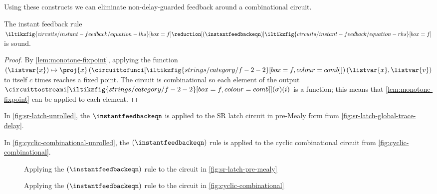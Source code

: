 \documentclass{lmcs}
\begin{document}
Using these constructs we can eliminate non-delay-guarded feedback around a
combinational circuit.

\begin{prop}\label{prop:instant-feedback}
    The instant feedback rule \(
    \iltikzfig{circuits/instant-feedback/equation-lhs}[box=f]
    \reduction[(\instantfeedbackeqn)]
    \iltikzfig{circuits/instant-feedback/equation-rhs}[box=f]
    \) is sound.
\end{prop}
\begin{proof}
    By \autoref{lem:monotone-fixpoint}, applying the function \(
    (\listvar{x}) \mapsto \proj{x}\left(\circuittofunci[
        \iltikzfig{strings/category/f-2-2}[box=f,colour=comb]
    ]\right)(\listvar{x}, \listvar{v})\) to itself \(c\) times reaches a
    fixed point.
    The circuit is combinational so each element of the output
    \(\circuittostreami[
        \iltikzfig{strings/category/f-2-2}[box=f,colour=comb]
    ](\sigma)(i)\) is a function; this means that \autoref{lem:monotone-fixpoint}
    can be applied to each element.
\end{proof}

\begin{exa}\label{ex:sr-latch-unrolled}
    In \autoref{fig:sr-latch-unrolled}, the \(\instantfeedbackeqn\) is applied to
    the SR latch circuit in pre-Mealy form from
    \autoref{fig:sr-latch-global-trace-delay}.
\end{exa}

\begin{exa}
    In \autoref{fig:cyclic-combinational-unrolled}, the \((\instantfeedbackeqn)\)
    rule is applied to the cyclic combinational circuit from
    \autoref{fig:cyclic-combinational}.
\end{exa}

\begin{figure}
    \centering
    \caption{
        Applying the \((\instantfeedbackeqn)\) rule to the circuit in
        \autoref{fig:sr-latch-pre-mealy}
    }
    \label{fig:sr-latch-unrolled}
\end{figure}
%
\begin{figure}
    \centering
    \caption{
        Applying the \((\instantfeedbackeqn)\) rule to the circuit in
        \autoref{fig:cyclic-combinational}
    }
    \label{fig:cyclic-combinational-unrolled}
\end{figure}
\end{document}
